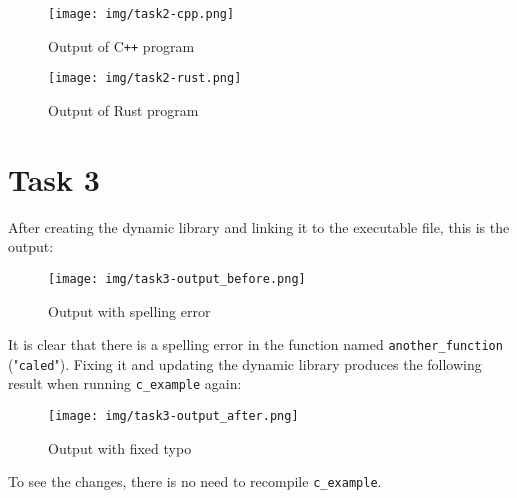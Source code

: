 \documentclass{article}
\begin{document}
\begin{figure}[H]
    \centering
    \texttt{[image: img/task2-cpp.png]}
    \caption{Output of C\texttt{++} program}
    \label{fig:Task 2 C++}
\end{figure}

\begin{figure}[H]
    \centering
    \texttt{[image: img/task2-rust.png]}
    \caption{Output of Rust program}
    \label{fig:Task 2 Rust}
\end{figure}

\section{Task 3}
After creating the dynamic library and linking it to the executable file, this is the output:

\begin{figure}[H]
    \centering
    \texttt{[image: img/task3-output\_before.png]}
    \caption{Output with spelling error}
    \label{fig:Task 3 before}
\end{figure}

It is clear that there is a spelling error in the function named \texttt{another\_function} ("\texttt{caled}").
Fixing it and updating the dynamic library produces the following result when running \texttt{c\_example} again:

\begin{figure}[H]
    \centering
    \texttt{[image: img/task3-output\_after.png]}
    \caption{Output with fixed typo}
    \label{fig:Task 3 after}
\end{figure}

To see the changes, there is no need to recompile \texttt{c\_example}.
\end{document}
